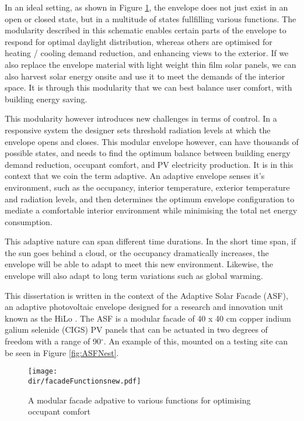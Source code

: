 
In an ideal setting, as shown in Figure \ref{fig:facadefunctions}, the envelope does not just exist in an open or closed state, but in a multitude of states fullfilling various functions. The modularity described in this schematic enables certain parts of the envelope to respond for optimal daylight distribution, whereas others are optimised for heating / cooling demand reduction, and enhancing views to the exterior. If we also replace the envelope material with light weight thin film solar panels, we can also harvest solar energy onsite and use it to meet the demands of the interior space. It is through this modularity that we can best balance user comfort, with building energy saving.

This modularity however introduces new challenges in terms of control. In a responsive system the designer sets threshold radiation levels at which the envelope opens and closes. This modular envelope however, can have thousands of possible states, and needs to find the optimum balance between building energy demand reduction, occupant comfort, and PV electricity production. It is in this context that we coin the term adaptive. An adaptive envelope senses it's environment, such as the occupancy, interior temperature, exterior temperature and radiation levels, and then determines the optimum envelope configuration to mediate a comfortable interior environment while minimising the total net energy consumption. 

This adaptive nature can span different time durations. In the short time span, if the sun goes behind a cloud, or the occupancy dramatically increases, the envelope will be able to adapt to meet this new environment. Likewise, the envelope will also adapt to long term variations such as global warming. 

This dissertation is written in the context of the Adaptive Solar Facade (ASF), an adaptive photovoltaic envelope designed for a research and innovation unit known as the HiLo \cite{Block2017}. The ASF is a modular facade of 40 x 40 cm copper indium galium selenide (CIGS) PV panels that can be actuated in two degrees of freedom with a range of 90$^{\circ}$. An example of this, mounted on a testing site can be seen in Figure \ref{fig:ASFNest}.


\begin{figure}
\begin{center}
\texttt{[image: \\dir/facadeFunctionsnew.pdf]}
\caption{A modular facade adpative to various functions for optimising occupant comfort}
\label{fig:facadefunctions}
\end{center}
\end{figure}

